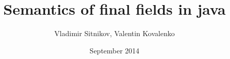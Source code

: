 \title[JMM: semantics of final fields]{Semantics of final fields in java}
\author{Vladimir Sitnikov, Valentin Kovalenko}
\date{\small September 2014}

\ifrender
\begin{frame}
  \titlepage
\end{frame}
\fi
